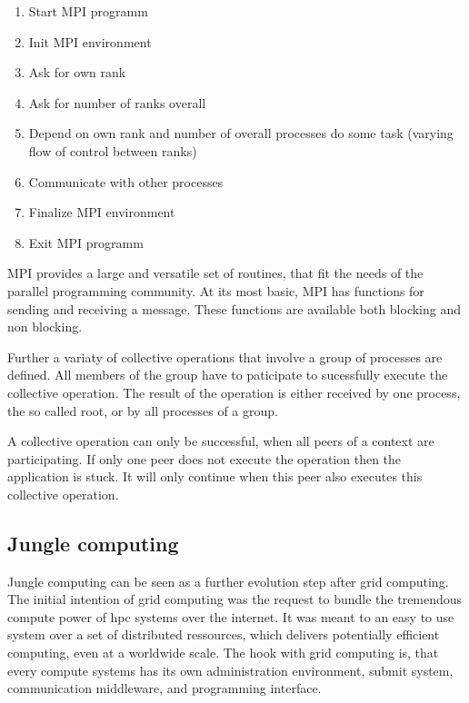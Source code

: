 \begin{enumerate}
\item Start MPI programm
\item Init MPI environment
\item Ask for own rank
\item Ask for number of ranks overall
\item Depend on own rank and number of overall processes do some task
  (varying flow of control between ranks)
\item Communicate with other processes
\item Finalize MPI environment
\item Exit MPI programm
\end{enumerate}

MPI provides a large and versatile set of routines, that fit the needs
of the parallel programming community. At its most basic, MPI has
functions for sending and receiving a message.  These functions are
available both blocking and non blocking.

Further a variaty of collective operations that involve a group of
processes are defined. All members of the group have to paticipate to
sucessfully execute the collective operation.  The result of the
operation is either received by one process, the so called root, or by
all processes of a group.

A collective operation can only be successful, when all peers of a
context are participating. If only one peer does not execute the
operation then the application is stuck. It will only continue when
this peer also executes this collective operation.


\subsection{Jungle computing}
\label{sec:jungle}
Jungle computing can be seen as a further evolution step after grid
computing. The initial intention of grid computing was the request to
bundle the tremendous compute power of hpc systems over the
internet\cite{ref:grid}. It was meant to an easy to use system over a
set of distributed ressources, which delivers potentially efficient
computing, even at a worldwide scale.  The hook with grid computing
is, that every compute systems has its own administration environment,
submit system, communication middleware, and programming interface.

